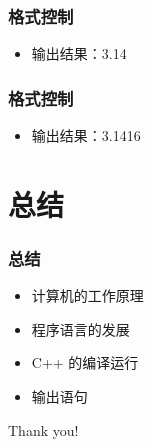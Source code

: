 \begin{frame}[fragile]
    \frametitle{格式控制}

    

    \begin{itemize}
        \item<2-> 输出结果：3.14
    \end{itemize}
\end{frame}

\begin{frame}[fragile]
    \frametitle{格式控制}

    

    \begin{itemize}
        \item<2-> 输出结果：3.1416
    \end{itemize}
\end{frame}


\section{总结}

\begin{frame}[fragile]
    \frametitle{总结}

    \begin{itemize}
        \item 计算机的工作原理
        \item 程序语言的发展
        \item C++ 的编译运行
        \item 输出语句
    \end{itemize}
\end{frame}

\begin{frame}
    \begin{center}
        {\Huge Thank you!}
    \end{center}
\end{frame}



